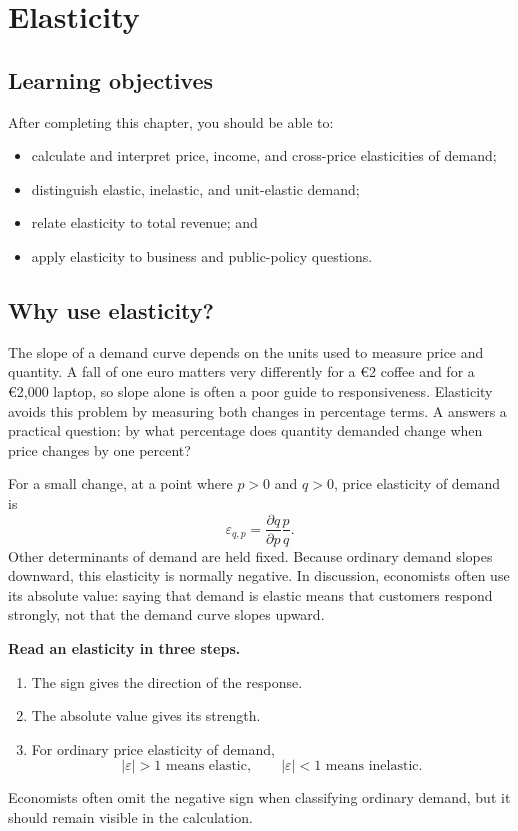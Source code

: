 \chapter{Elasticity}
\label{chap:elasticity}

\section{Learning objectives}

After completing this chapter, you should be able to:
\begin{itemize}
  \item calculate and interpret price, income, and cross-price elasticities of demand;
  \item distinguish elastic, inelastic, and unit-elastic demand;
  \item relate elasticity to total revenue; and
  \item apply elasticity to business and public-policy questions.
\end{itemize}

\section{Why use elasticity?}

The slope of a demand curve depends on the units used to measure price and quantity. A fall of one euro matters very differently for a \euro2 coffee and for a \euro2{,}000 laptop, so slope alone is often a poor guide to responsiveness. Elasticity avoids this problem by measuring both changes in percentage terms. A  answers a practical question: by what percentage does quantity demanded change when price changes by one percent?

For a small change, at a point where $p>0$ and $q>0$, price elasticity of
demand is
\[
\varepsilon_{q,p}=\frac{\partial q}{\partial p}\frac{p}{q}.
\]
Other determinants of demand are held fixed. Because ordinary demand slopes
downward, this elasticity is normally negative. In discussion, economists
often use its absolute value: saying that demand is elastic means that
customers respond strongly, not that the demand curve slopes upward.

\begin{keyidea}
\textbf{Read an elasticity in three steps.}
\begin{enumerate}
  \item The sign gives the direction of the response.
  \item The absolute value gives its strength.
  \item For ordinary price elasticity of demand,
  \[
  |\varepsilon|>1 \text{ means elastic},
  \qquad
  |\varepsilon|<1 \text{ means inelastic}.
  \]
\end{enumerate}
Economists often omit the negative sign when classifying ordinary demand, but
it should remain visible in the calculation.
\end{keyidea}


